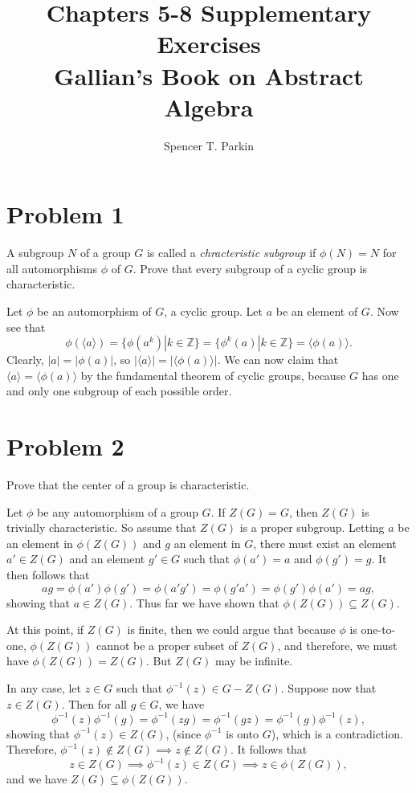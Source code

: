 \documentclass[12pt]{article}
\title{Chapters 5-8 Supplementary Exercises\\Gallian's Book on Abstract Algebra}
\author{Spencer T. Parkin}
\newcommand{\Z}{\mathbb{Z}}
\begin{document}
\maketitle

\section*{Problem 1}

A subgroup $N$ of a group $G$ is called a {\it chracteristic subgroup} if $\phi(N)=N$
for all automorphisms $\phi$ of $G$.  Prove that every subgroup of a cyclic group is characteristic.

Let $\phi$ be an automorphism of $G$, a cyclic group.
Let $a$ be an element of $G$.  Now see that
\begin{equation*}
\phi(\langle a\rangle)=\{\phi(a^k)|k\in\Z\}=\{\phi^k(a)|k\in\Z\}=\langle\phi(a)\rangle.
\end{equation*}
Clearly, $|a|=|\phi(a)|$, so $|\langle a\rangle|=|\langle\phi(a)\rangle|$.  We can
now claim that $\langle a\rangle=\langle \phi(a)\rangle$ by the fundamental
theorem of cyclic groups, because $G$ has one and only one subgroup of each
possible order.

\section*{Problem 2}

Prove that the center of a group is characteristic.

Let $\phi$ be any automorphism of a group $G$.
If $Z(G)=G$, then $Z(G)$ is trivially characteristic.
So assume that $Z(G)$ is a proper subgroup.
Letting $a$ be an element in $\phi(Z(G))$ and $g$ an element in $G$,
there must exist an element $a'\in Z(G)$ and an element $g'\in G$ such
that $\phi(a')=a$ and $\phi(g')=g$.  It then follows that
\begin{equation*}
ag=\phi(a')\phi(g')=\phi(a'g')=\phi(g'a')=\phi(g')\phi(a')=ag,
\end{equation*}
showing that $a\in Z(G)$.
Thus far we have shown that $\phi(Z(G))\subseteq Z(G)$.

At this point, if $Z(G)$ is finite, then we could argue that
because $\phi$ is one-to-one, $\phi(Z(G))$ cannot be a proper
subset of $Z(G)$, and therefore, we must have $\phi(Z(G))=Z(G)$.
But $Z(G)$ may be infinite.

In any case, let $z\in G$ such that $\phi^{-1}(z)\in G-Z(G)$.
Suppose now that $z\in Z(G)$.  Then for all $g\in G$, we have
\begin{equation*}
\phi^{-1}(z)\phi^{-1}(g)=\phi^{-1}(zg)=\phi^{-1}(gz)=\phi^{-1}(g)\phi^{-1}(z),
\end{equation*}
showing that $\phi^{-1}(z)\in Z(G)$, (since $\phi^{-1}$ is onto $G$), which is a contradiction.
Therefore, $\phi^{-1}(z)\not\in Z(G)\implies z\not\in Z(G)$.
It follows that
\begin{equation*}
z\in Z(G)\implies\phi^{-1}(z)\in Z(G)\implies z\in \phi(Z(G)),
\end{equation*}
and we have $Z(G)\subseteq\phi(Z(G))$.
\end{document}

